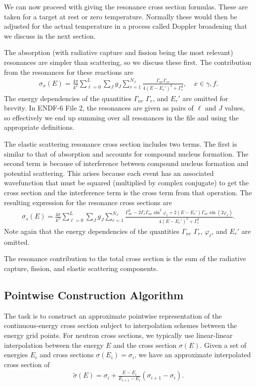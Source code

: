 We can now proceed with giving the resonance cross section formulas. These are taken for a target at rest or zero temperature. Normally these would then be adjusted for the actual temperature in a process called Doppler broadening that we discuss in the next section.

The absorption (with radiative capture and fission being the most relevant) resonances are simpler than scattering, so we discuss these first. The contribution from the resonances for these reactions are
\begin{align}
  \sigma_x(E) = \frac{4\pi}{k^2} \sum_{\ell = 0}^L \sum_J g_J \sum_{r = 1}^{N_J} \frac{ \Gamma_{nr} \Gamma_{xr} }{ 4 ( E - E_r' )^2 + \Gamma_r^2 } , \quad x \in \gamma, f.
\end{align} 
The energy dependencies of the quantities $\Gamma_{nr}$ $\Gamma_r$, and $E_r'$ are omitted for brevity. In ENDF-6 File 2, the resonances are given as pairs of $\ell$ and $J$ values, so effectively we end up summing over all resonances in the file and using the appropriate definitions.

The elastic scattering resonance cross section includes two terms. The first is similar to that of absorption and accounts for compound nucleus formation. The second term is because of interference between compound nucleus formation and potential scattering. This arises because each event has an associated wavefunction that must be squared (multiplied by complex conjugate) to get the cross section and the interference term is the cross term from that operation. The resulting expression for the resonance cross sections are
\begin{align}
  \sigma_s(E) = \frac{4\pi}{k^2} \sum_{\ell = 0}^L \sum_J g_J \sum_{r = 1}^{N_J} \frac{ \Gamma_{nr}^2 - 2 \Gamma_r \Gamma_{nr} \sin^2\varphi_\ell + 2 (E - E_r' ) \Gamma_{nr} \sin(2\varphi_\ell) }{ 4 ( E - E_r' )^2 + \Gamma_r^2 } .
\end{align} 
Note again that the energy dependencies of the quantities $\Gamma_{nr}$ $\Gamma_r$, $\varphi_\ell$, and $E_r'$ are omitted.

The resonance contribution to the total cross section is the sum of the radiative capture, fission, and elastic scattering components.

\subsection{Pointwise Construction Algorithm}

The task is to construct an approximate pointwise representation of the continuous-energy cross section subject to interpolation schemes between the energy grid points. For neutron cross sections, we typically use linear-linear interpolation between the energy $E$ and the cross section $\sigma(E)$. Given a set of energies $E_i$ and cross sections $\sigma(E_i) = \sigma_i$, we have an approximate interpolated cross section of
\begin{align}
  \widetilde{\sigma}(E) = \sigma_i + \frac{ E - E_i }{ E_{i+1} - E_i } ( \sigma_{i+1} - \sigma_i ) .
\end{align}

